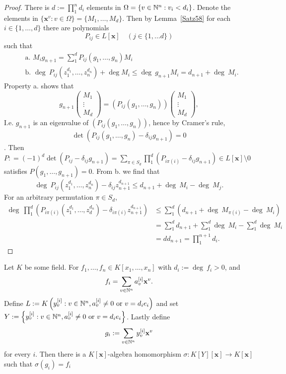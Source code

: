     \begin{proof}
        There is $d:= \prod_1^n d_i$ elements in $\Omega=\{v\in \mathbb{N}^n : v_i<d_i\}$. Denote the elements in $\{\mathbf{x}^v : v\in \Omega\}=\{M_1,\dots,M_{d}\}$. Then by Lemma~\ref{Satz58} for each $i\in\{1,\dots,d\}$ there are polynomials 
        $$P_{ij}\in L[\mathbf{x}]\quad (j\in\{1,\dots d\})$$
        such that 
        \begin{align*}
            &\text{a. } M_ig_{n+1}=\sum_1^d P_{ij}(g_1,\dots,g_n)M_i\\
            &\text{b. } \deg\ P_{ij}(z_1^{d_1},\dots,z_n^{d_n}) + \deg M_i\leq \deg \ g_{n+1}M_i = d_{n+1}+\deg \ M_i.
        \end{align*}
        Property a. shows that 
        $$
            g_{n+1}
            \begin{pmatrix}
                M_1\\ \vdots\\ M_d
            \end{pmatrix} 
            =
            (P_{ij}(g_1,\dots,g_n)) \begin{pmatrix}
                M_1\\ \vdots\\ M_d
            \end{pmatrix}, 
        $$
        I.e. $g_{n+1}$ is an eigenvalue of $(P_{ij}(g_1,\dots,g_n))$, hence by Cramer's rule,  
        $$\det(P_{ij}(g_1,\dots,g_n)-\delta_{ij}g_{n+1}) =  0$$. Then $P: = (-1)^d\det(P_{ij}-\delta_{ij}g_{n+1})= \sum_{\pi\in S_d} \prod_1^d (P_{i\pi(i)}-\delta_{ij}g_{n+1})\in L[\mathbf{x}]\setminus 0$ satisfies $P(g_1,\dots,g_{n+1})=0.$ From b. we find that 
        $$\deg \ P_{ij}(z_1^{d_1},\dots,z_n^{d_n}) - \delta_{ij}z_{n+1}^{d_{n+1}}\leq d_{n+1}+\deg \ M_i - \deg \ M_j.$$
        For an arbitrary permutation $\pi \in S_d$,
        \begin{align*}
            \deg \ \prod_1^d (P_{i\pi(i)}(z_1^{d_1},\dots,z_d^{d_n})-\delta_{i\pi(i)}z_{n+1}^{d_{n+1}})&\leq \sum_1^d (d_{n+1} + \deg\ M_{\pi(i)}-\deg \ M_{i})\\
            &= \sum_1^d d_{n+1} + \sum_1^d \deg \ M_i -\sum_1^d\deg \ M_i\\ &= d d_{n+1} = \prod_1^{n+1} d_i. 
        \end{align*}
    \end{proof}
    \begin{lemma}
        Let $K$ be some field. For $f_1,\dots,f_n\in K[x_1,\dots,x_n]$ with $d_i := \deg\ f_i>0$, and 
        $$f_i = \sum_{v\in \mathbb{N}^n} a_v^{[i]}\mathbf{x}^v.$$
        Define $L:= K\left( y_v^{[i]} : v\in \mathbb{N}^n, a_v^{[i]}\neq 0 \text{ or } v=d_ie_i\right)$ and set $Y:=\left\{y_v^{[i]} : v\in \mathbb{N}^n, a_v^{[i]}\neq 0 \text{ or } v=d_ie_i\right\}$. Lastly define 
        $$g_i := \sum_{v\in \mathbb{N}^n} y_v^{[i]}\mathbf{x}^v$$
        for every $i$. Then there is a $K[\mathbf{x}]$-algebra homomorphism $\sigma: K[Y][\mathbf{x}]\rightarrow K[\mathbf{x}]$ such that $\sigma(g_i)=f_i$
    \end{lemma}
